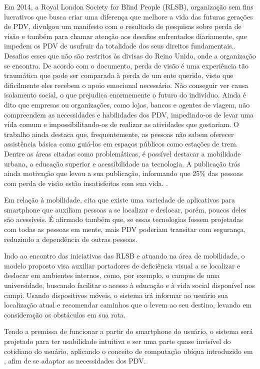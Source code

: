 \documentclass[english,brazilian]{UNISINOSmonografia}
\begin{document}
Em 2014, a Royal London Society for Blind People (RLSB), organização sem fins lucrativos que busca criar uma diferença que melhore a vida das futuras gerações de PDV, divulgou um manifesto com o resultado de pesquisas sobre perda de visão e também para chamar atenção aos desafios enfrentados diariamente, que impedem os PDV de usufruir da totalidade dos seus direitos fundamentais.\cite{YouthManifesto}. Desafios esses que não são restritos às divisas do Reino Unido, onde a organização se encontra.
De acordo com o documento, perda de visão é uma experiência tão traumática que pode ser comparada à perda de um ente querido, visto que dificilmente eles recebem o apoio emocional necessário. Não conseguir ver causa isolamento social, o que prejudica enormemente o futuro do individuo. Ainda é dito que empresas ou organizações, como lojas, bancos e agentes de viagem, não compreendem as necessidades e habilidades dos PDV, impedindo-os de levar uma vida comum e impossibilitando-os de realizar as atividades que gostariam. O trabalho ainda destaca que, frequentemente, as pessoas não sabem oferecer assistência básica como guiá-los em espaços públicos como estações de trem. Dentre as áreas citadas como problemáticas, é possível destacar a mobilidade urbana, a educação superior e acessibilidade na tecnologia. A publicação trás ainda motivação que levou a sua publicação, informando que 25\% das pessoas com perda de visão estão insatisfeitas com sua vida. \cite{YouthManifesto}.

Em relação à mobilidade,  cita que existe uma variedade de aplicativos para smartphone que auxiliam pessoas a se localizar e deslocar, porém, poucos deles são acessíveis. É afirmado também que, se essas tecnologias fossem projetadas com todas as pessoas em mente, mais PDV poderiam transitar com segurança, reduzindo a dependência de outras pessoas. 

Indo ao encontro das iniciativas das RLSB e atuando na área de mobilidade, o modelo proposto visa auxiliar portadores de deficiência visual a se localizar e deslocar em ambientes internos, como, por exemplo, o campus de uma universidade, buscando facilitar o acesso à educação e à vida social disponível nos campi. Usando dispositivos móveis, o sistema irá informar ao usuário sua localização atual e recomendar caminhos que o levem ao seu destino, levando em consideração os obstáculos em sua rota.

Tendo a premissa de funcionar a partir do smartphone do usuário, o sistema será projetado para ter usabilidade intuitiva e ser uma parte quase invisível do cotidiano do usuário, aplicando o conceito de computação ubíqua introduzido em , afim de se adaptar as necessidades dos PDV.
\end{document}

